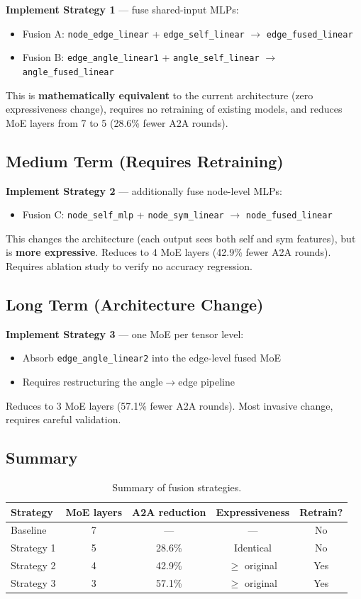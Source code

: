 \documentclass[11pt,a4paper]{article}
\begin{document}
\textbf{Implement Strategy 1} --- fuse shared-input MLPs:
\begin{itemize}
    \item Fusion A: \texttt{node\_edge\_linear} + \texttt{edge\_self\_linear} $\to$ \texttt{edge\_fused\_linear}
    \item Fusion B: \texttt{edge\_angle\_linear1} + \texttt{angle\_self\_linear} $\to$ \texttt{angle\_fused\_linear}
\end{itemize}
This is \textbf{mathematically equivalent} to the current architecture (zero expressiveness change), requires no retraining of existing models, and reduces MoE layers from 7 to 5 (28.6\% fewer A2A rounds).

\subsection{Medium Term (Requires Retraining)}

\textbf{Implement Strategy 2} --- additionally fuse node-level MLPs:
\begin{itemize}
    \item Fusion C: \texttt{node\_self\_mlp} + \texttt{node\_sym\_linear} $\to$ \texttt{node\_fused\_linear}
\end{itemize}
This changes the architecture (each output sees both self and sym features), but is \textbf{more expressive}. Reduces to 4 MoE layers (42.9\% fewer A2A rounds). Requires ablation study to verify no accuracy regression.

\subsection{Long Term (Architecture Change)}

\textbf{Implement Strategy 3} --- one MoE per tensor level:
\begin{itemize}
    \item Absorb \texttt{edge\_angle\_linear2} into the edge-level fused MoE
    \item Requires restructuring the angle$\to$edge pipeline
\end{itemize}
Reduces to 3 MoE layers (57.1\% fewer A2A rounds). Most invasive change, requires careful validation.

\subsection{Summary}

\begin{table}[h]
\centering
\begin{tabular}{lcccc}
\toprule
Strategy & MoE layers & A2A reduction & Expressiveness & Retrain? \\
\midrule
Baseline & 7 & --- & --- & No \\
Strategy 1 & 5 & 28.6\% & Identical & No \\
Strategy 2 & 4 & 42.9\% & $\geq$ original & Yes \\
Strategy 3 & 3 & 57.1\% & $\geq$ original & Yes \\
\bottomrule
\end{tabular}
\caption{Summary of fusion strategies.}
\end{table}
\end{document}
